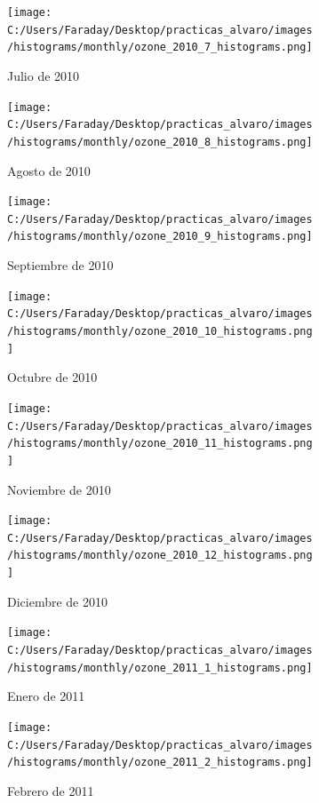 \documentclass[12pt]{article}
\begin{document}
\newpage

\begin{figure}[H]
\centering
\begin{subfigure}[h]{0.45\textwidth}
\texttt{[image: C:/Users/Faraday/Desktop/practicas\_alvaro/images/histograms/monthly/ozone\_2010\_7\_histograms.png]}
\caption{Julio de 2010}
\label{fig:hist-mon-2-7-2010}
\end{subfigure}
%
\begin{subfigure}[H]{0.45\textwidth}
\texttt{[image: C:/Users/Faraday/Desktop/practicas\_alvaro/images/histograms/monthly/ozone\_2010\_8\_histograms.png]}
\caption{Agosto de 2010}
\label{fig:hist-mon-2-8-2010}
\end{subfigure}
\caption{}
\end{figure}

\begin{figure}[H]
\centering
\begin{subfigure}[h]{0.45\textwidth}
\texttt{[image: C:/Users/Faraday/Desktop/practicas\_alvaro/images/histograms/monthly/ozone\_2010\_9\_histograms.png]}
\caption{Septiembre de 2010}
\label{fig:hist-mon-2-9-2010}
\end{subfigure}
%
\begin{subfigure}[H]{0.45\textwidth}
\texttt{[image: C:/Users/Faraday/Desktop/practicas\_alvaro/images/histograms/monthly/ozone\_2010\_10\_histograms.png]}
\caption{Octubre de 2010}
\label{fig:hist-mon-2-10-2010}
\end{subfigure}
\caption{}
\end{figure}

\begin{figure}[H]
\centering
\begin{subfigure}[h]{0.45\textwidth}
\texttt{[image: C:/Users/Faraday/Desktop/practicas\_alvaro/images/histograms/monthly/ozone\_2010\_11\_histograms.png]}
\caption{Noviembre de 2010}
\label{fig:hist-mon-2-11-2010}
\end{subfigure}
%
\begin{subfigure}[H]{0.45\textwidth}
\texttt{[image: C:/Users/Faraday/Desktop/practicas\_alvaro/images/histograms/monthly/ozone\_2010\_12\_histograms.png]}
\caption{Diciembre de 2010}
\label{fig:hist-mon-2-12-2010}
\end{subfigure}
\caption{}
\end{figure}

\newpage

\begin{figure}[H]
\centering
\begin{subfigure}[h]{0.45\textwidth}
\texttt{[image: C:/Users/Faraday/Desktop/practicas\_alvaro/images/histograms/monthly/ozone\_2011\_1\_histograms.png]}
\caption{Enero de 2011}
\label{fig:hist-mon-2-1-2011}
\end{subfigure}
%
\begin{subfigure}[H]{0.45\textwidth}
\texttt{[image: C:/Users/Faraday/Desktop/practicas\_alvaro/images/histograms/monthly/ozone\_2011\_2\_histograms.png]}
\caption{Febrero de 2011}
\label{fig:hist-mon-2-2-2011}
\end{subfigure}
\caption{}
\end{figure}
\end{document}
